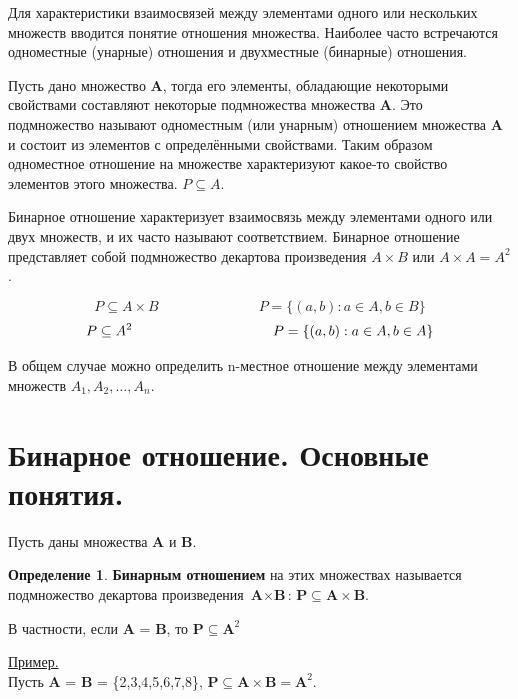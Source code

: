 \documentclass[12pt, a4paper, oneside]{article}
\theoremstyle{plain} %
\theoremstyle{definition}
\newtheorem*{definition}{Определение}  %
\newcommand{\indef}[1]{\textbf{ \color{dark_red} #1}}
\begin{document}
Для характеристики взаимосвязей между элементами одного или нескольких множеств вводится понятие отношения множества. Наиболее часто встречаются одноместные (унарные) отношения и двухместные (бинарные) отношения. \par

Пусть дано множество \textbf{A}, тогда его элементы, обладающие некоторыми свойствами составляют некоторые подмножества множества \textbf{A}. Это подмножество называют одноместным (или унарным) отношением множества \textbf{A} и состоит из элементов с определёнными свойствами. Таким образом одноместное отношение на множестве характеризуют какое-то свойство элементов этого множества. $P \subseteq A$.\par

Бинарное отношение характеризует взаимосвязь между элементами одного или двух множеств, и их часто называют соответствием. Бинарное отношение представляет собой подмножество декартова произведения $A \times B$ или $A \times A = A^2$. 

\[P \subseteq A \times B \hspace{3cm} P = \{(a,b): a \in A, b \in B\}\]
\[P \subseteq A^2 \hspace{3.53cm} P = \{(a,b): a \in A, b \in A\}\] \par

В общем случае можно определить n-местное отношение между элементами множеств $A_1, A_2, ... , A_n$.

\section{Бинарное отношение. Основные понятия.}

Пусть даны множества \textbf{A} и \textbf{B}.

\begin{definition}
\indef{Бинарным отношением} на этих множествах называется подмножество декартова произведения $\textbf{A} \times \textbf{B}$: $\textbf{P} \subseteq \textbf{A} \times \textbf{B}$.
\end{definition}

В частности, если \textbf{A} = \textbf{B}, то $\textbf{P} \subseteq \textbf{A}^2$ \par

\underline{Пример.} \\ Пусть \textbf{A} = \textbf{B} = \{2,3,4,5,6,7,8\}, \hspace{2mm}
$\textbf{P} \subseteq \textbf{A} \times \textbf{B} = \textbf{A}^2$. 
\end{document}
